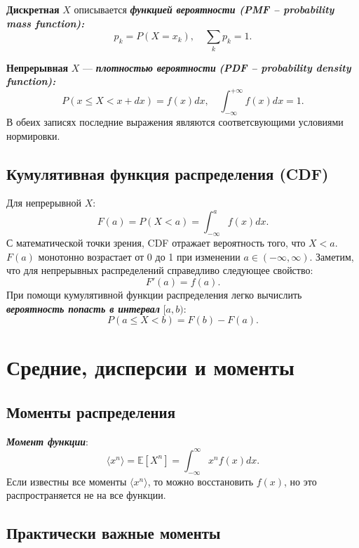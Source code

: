 \documentclass[
  russian,
  12pt,
  a4paper,
  a4paper,
  openany]{scrbook}
\begin{document}
\textbf{Дискретная} \(X\) описывается \textbf{\emph{функцией вероятности
(PMF -- probability mass function):}}
\[p_k=P(X=x_k), \quad \sum_k p_k=1.\]

\textbf{Непрерывная} \(X\) --- \textbf{\emph{плотностью вероятности}}
\textbf{\emph{(PDF -- probability density function):}}
\[P(x\leq X<x+dx)=f(x)dx, \quad \int_{-\infty}^{+\infty}f(x)dx=1.\] В
обеих записях последние выражения являются соответсвующими условиями
нормировки.

\subsection{Кумулятивная функция распределения
(CDF)}\label{ux43aux443ux43cux443ux43bux44fux442ux438ux432ux43dux430ux44f-ux444ux443ux43dux43aux446ux438ux44f-ux440ux430ux441ux43fux440ux435ux434ux435ux43bux435ux43dux438ux44f-cdf}

Для непрерывной \(X\): \[F(a)=P(X<a)=\int_{-\infty}^a f(x)dx.\] С
математической точки зрения, CDF отражает вероятность того, что \(X<a.\)
\(F(a)\) монотонно возрастает от 0 до 1 при изменении
\(a \in (-\infty,\infty)\). Заметим, что для непрерывных распределений
справедливо следующее свойство: \[F'(a)=f(a).\] При помощи кумулятивной
функции распределения легко вычислить \textbf{\emph{вероятность попасть
в интервал}} \([a,b):\) \[P(a\leq X<b)=F(b)-F(a).\]

\section{Средние, дисперсии и
моменты}\label{ux441ux440ux435ux434ux43dux438ux435-ux434ux438ux441ux43fux435ux440ux441ux438ux438-ux438-ux43cux43eux43cux435ux43dux442ux44b}

\subsection{Моменты
распределения}\label{ux43cux43eux43cux435ux43dux442ux44b-ux440ux430ux441ux43fux440ux435ux434ux435ux43bux435ux43dux438ux44f}

\textbf{\emph{Момент функции}}:
\[\langle x^n\rangle=\mathbb{E}[X^n]=\int_{-\infty}^\infty x^nf(x)dx.\]
Если известны все моменты \(\langle x^n\rangle\), то можно восстановить
\(f(x)\), но это распространяется не на все функции.

\subsection{Практически важные
моменты}\label{ux43fux440ux430ux43aux442ux438ux447ux435ux441ux43aux438-ux432ux430ux436ux43dux44bux435-ux43cux43eux43cux435ux43dux442ux44b}
\end{document}
